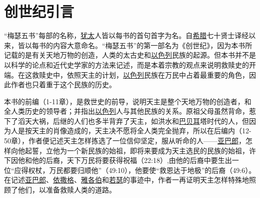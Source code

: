 \chapter*{创世纪引言}


“梅瑟五书”每部的名称，\uline{犹太}人皆以每书的首句首字为名。自\uline{希腊}七十贤士译经以来，皆以每书的内容大意命名。“梅瑟五书”的第一部名为《创世纪》，因为本书所记载的是有关天地万物的创造，人类的太古史和\uline{以色列}民族的起源。但本书并不是以科学的论点和近代史学家的方法来记述，而是本着宗教的观点来说明救赎史的开端。在这救赎史中，依照天主的计划，\uline{以色列}民族在万民中占着最重要的角色，因此作者也只着重于这个民族的历史。

本书的前编（1-11章），是救世史的前导，说明天主是整个天地万物的创造者，和全人类历史的领导者；并指出\uline{以色列}人与其他民族的关系。原祖父母虽然背命，惹下了滔天大祸，后继的人们也多半背弃了天主，如洪水和\uline{巴贝耳}塔时代的人，但因为人是按天主的肖像造成的，天主决不愿将全人类完全抛弃，所以在后编内（12-50章），作者便记述天主怎样拣选了一位信仰坚定，服从听命的人——\uline{亚巴郎}，怎样向他起誓，立他为一个新民族的始祖，即将来要成为天主选民的民族的始祖，许下因他和他的后裔，天下万民将要获得祝福（22:18）,由他的后裔中要生出一位“应得权杖，万民都要归顺他”（49:10），他要使“救恩达于地极”的后裔（49:6）。在记述\uline{亚巴郎}、\uline{依撒格}、\uline{雅各伯}和\uline{若瑟}的事迹中，作者一再证明天主怎样特殊地照顾了他们，以准备救赎人类的道路。